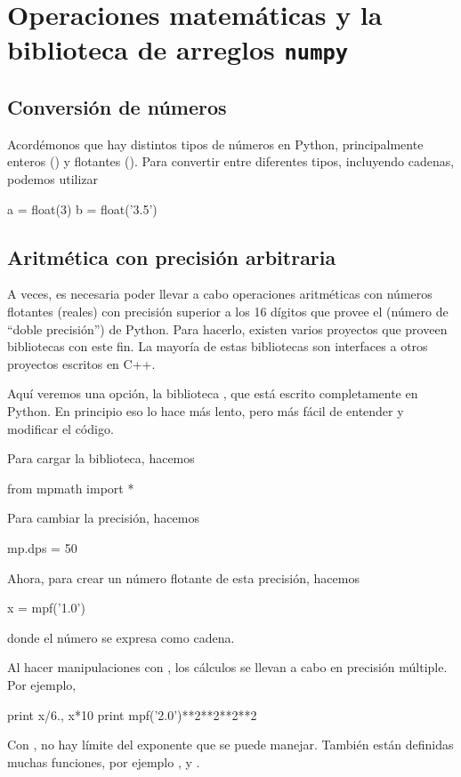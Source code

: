 \chapter{Operaciones matemáticas y la biblioteca de arreglos \texttt{numpy}}

\section{Conversión de números}
Acordémonos que hay distintos tipos de números en Python, principalmente enteros () y flotantes ().
Para convertir entre diferentes tipos, incluyendo cadenas, podemos utilizar
\begin{python}
a = float(3)
b = float('3.5')
\end{python}


\section{Aritmética con precisión arbitraria}

A veces, es necesaria poder llevar a cabo operaciones aritméticas con números flotantes (reales) con precisión superior a los 16 dígitos que provee el  (número de ``doble precisión'') de Python. Para hacerlo, existen varios proyectos que proveen bibliotecas con este fin.
La mayoría de estas bibliotecas son interfaces a otros proyectos escritos en C++.

Aquí veremos una opción, la biblioteca , que está escrito completamente en Python. En principio eso lo hace más lento, pero más fácil de entender y modificar el código.

Para cargar la biblioteca, hacemos
\begin{python}
from mpmath import *
\end{python}
Para cambiar la precisión, hacemos
\begin{python}
mp.dps = 50
\end{python}
Ahora, para crear un número flotante de esta precisión, hacemos
\begin{python}
x = mpf('1.0')
\end{python}
donde el número se expresa como cadena.

Al hacer manipulaciones con , los cálculos se llevan a cabo en precisión múltiple.
Por ejemplo,
\begin{python}
print x/6., x*10
print mpf('2.0')**2**2**2**2
\end{python}
Con , no hay límite del exponente que se puede manejar.
También están definidas muchas funciones, por ejemplo ,  y .

